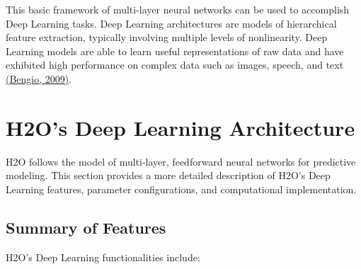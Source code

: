 This basic framework of multi-layer neural networks can be used to accomplish Deep Learning tasks. Deep Learning architectures are models of hierarchical feature extraction, typically involving multiple levels of nonlinearity. Deep Learning models are able to learn useful representations of raw data and have exhibited high performance on complex data such as images, speech, and text \href{http://www.iro.umontreal.ca/~lisa/pointeurs/TR1312.pdf}{(Bengio, 2009)}. 

\section{H2O's Deep Learning Architecture} 

H2O follows the model of multi-layer, feedforward neural networks for predictive modeling. This section provides a more detailed description of H2O's Deep Learning features, parameter configurations, and computational implementation.

\newpage
\subsection{Summary of Features} 

H2O's Deep Learning functionalities include: 

